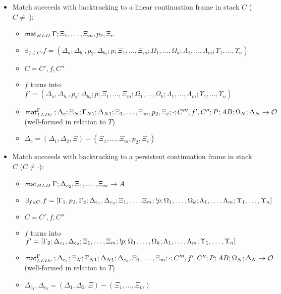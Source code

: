 \begin{lemma}
\begin{itemize}[leftmargin=*]
      \item Match succeeds with backtracking to a linear continuation frame in
      stack $C$ ($C \neq \cdot$):

      \begin{itemize}[leftmargin=\secondm]
         \item $\mathsf{mat}_{HLD} \; \Gamma; \Xi_1, \dotsc, \Xi_m, p_2, \Xi_c$
         \item $\exists_{f \in C}. f = (\Delta_a; \Delta_{b_1}, p_2,
               \Delta_{b_2}; p; \Xi_1, \dotsc, \Xi_m; \Omega_1, \dotsc,
               \Omega_k; \Lambda_1, \dotsc, \Lambda_m; \Upsilon_1, \dotsc,
               \Upsilon_n)$
         \item $C = C', f, C''$
         \item $f$ turns into $f' = (\Delta_a, \Delta_{b_1}, p_2;
               \Delta_{b_2}; p; \Xi_1, \dotsc, \Xi_m;
               \Omega_1, \dotsc, \Omega_k; \Lambda_1, \dotsc, \Lambda_m;
               \Upsilon_1, \dotsc, \Upsilon_n)$
         \item $\mathsf{mat}_{LLDc}^{\Gamma} \;; \Delta_c; \Xi_N; \Gamma_{N1}; \Delta_{N1}; \Xi_1,
            \dotsc, \Xi_m, p_2, \Xi_c; \cdot; C''', f', C''; P;
            AB; \Omega_N; \Delta_N \rightarrow \mathcal{O}$ (well-formed in relation to $T$)
         \item $\Delta_c = (\Delta_1, \Delta_2, \Xi) - (\Xi_1, \dotsc, \Xi_m,
               p_2, \Xi_c)$
      \end{itemize}

      \item Match succeeds with backtracking to a persistent continuation frame
      in stack $C$ ($C \neq \cdot$):
      \begin{itemize}[leftmargin=\secondm]
         \item $\mathsf{mat}_{HLD} \; \Gamma; \Delta_{c_2}, \Xi_1, \dotsc, \Xi_m \rightarrow A$
         \item $\exists_{f \in C}. f = [\Gamma_1, p_2, \Gamma_2; \Delta_{c_1},
            \Delta_{c_2}; \Xi_1, \dotsc, \Xi_m; {!} p; \Omega_1, \dotsc, \Omega_k;
            \Lambda_1, \dotsc, \Lambda_m; \Upsilon_1, \dotsc, \Upsilon_n]$
         \item $C = C', f, C''$
         \item $f$ turns into $f' = [\Gamma_2; \Delta_{c_1}, \Delta_{c_2};
            \Xi_1, \dotsc, \Xi_m; {!} p; \Omega_1, \dotsc, \Omega_k; \Lambda_1,
            \dotsc, \Lambda_m; \Upsilon_1, \dotsc, \Upsilon_n]$
         \item $\mathsf{mat}_{LLDc}^{\Gamma} \;; \Delta_{c_1}; \Xi_N; \Gamma_{N1}; \Delta_{N1};
            \Delta_{c_2}, \Xi_1, \dotsc, \Xi_m; \cdot; C''', f', C''; P;
            AB; \Omega_N; \Delta_N \rightarrow \mathcal{O}$ (well-formed in relation to $T$)
         \item $\Delta_{c_1}, \Delta_{c_2} = (\Delta_1, \Delta_2, \Xi) - (\Xi_1, \dotsc, \Xi_m)$
      \end{itemize}


\end{itemize}
\end{lemma}
